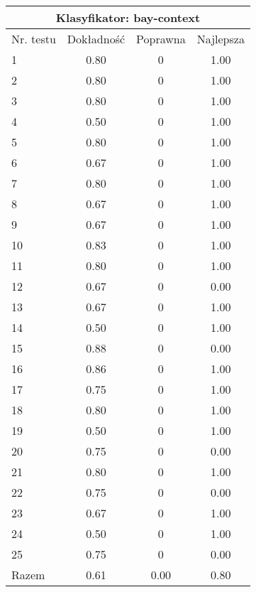 \begin{tabular}{|l|c|c|c|}
\hline
\multicolumn{4}{|c|}{Klasyfikator: bay-context}\\
\hline
Nr. testu & Dokładność & Poprawna & Najlepsza\\
\hline
1 & 0.80 & 0 & 1.00 \\
2 & 0.80 & 0 & 1.00 \\
3 & 0.80 & 0 & 1.00 \\
4 & 0.50 & 0 & 1.00 \\
5 & 0.80 & 0 & 1.00 \\
6 & 0.67 & 0 & 1.00 \\
7 & 0.80 & 0 & 1.00 \\
8 & 0.67 & 0 & 1.00 \\
9 & 0.67 & 0 & 1.00 \\
10 & 0.83 & 0 & 1.00 \\
11 & 0.80 & 0 & 1.00 \\
12 & 0.67 & 0 & 0.00 \\
13 & 0.67 & 0 & 1.00 \\
14 & 0.50 & 0 & 1.00 \\
15 & 0.88 & 0 & 0.00 \\
16 & 0.86 & 0 & 1.00 \\
17 & 0.75 & 0 & 1.00 \\
18 & 0.80 & 0 & 1.00 \\
19 & 0.50 & 0 & 1.00 \\
20 & 0.75 & 0 & 0.00 \\
21 & 0.80 & 0 & 1.00 \\
22 & 0.75 & 0 & 0.00 \\
23 & 0.67 & 0 & 1.00 \\
24 & 0.50 & 0 & 1.00 \\
25 & 0.75 & 0 & 0.00 \\
\hline
Razem & 0.61 & 0.00 & 0.80 \\
\hline
\end{tabular}
